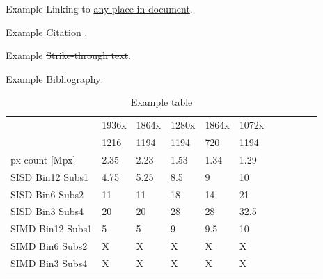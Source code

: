 \documentclass[11pt]{article}
\begin{document}
Example Linking to \hyperlink{anyplace}{any place in document}.

Example Citation \cite{example1988}.

Example \sout{Strike-through text}.

Example Bibliography:

\printbibliography

\begin{table}[ht]
    \centering
    \begin{tabular}{|l|l|l|l|l|l|l|l|l|l|l|}
        \hline
         & \textsf{1936x} & \textsf{1864x} & \textsf{1280x} & \textsf{1864x} & \textsf{1072x} \\
         & \textsf{1216}  & \textsf{1194}  & \textsf{1194}  & \textsf{720}   & \textsf{1194}  \\
        \hline
        px count [Mpx] & 2.35 & 2.23 & 1.53 & 1.34 & 1.29 \\
        \hline
        \hline
        \hline
        SISD Bin12 Subs1 & 4.75  & 5.25  & 8.5   & 9     & 10    \\ \hline
        SISD Bin6 Subs2  & 11    & 11    & 18    & 14    & 21    \\ \hline
        SISD Bin3 Subs4  & 20    & 20    & 28    & 28    & 32.5  \\
        \hline                                                                 
        \hline                                                                 
        SIMD Bin12 Subs1 & 5     & 5     & 9     & 9.5   & 10    \\ \hline
        SIMD Bin6 Subs2  & X     & X     & X     & X     & X     \\ \hline
        SIMD Bin3 Subs4  & X     & X     & X     & X     & X     \\ \hline
    \end{tabular}
    \caption{Example table}
\end{table}
\end{document}
